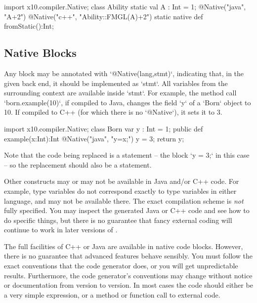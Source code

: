 \begin{xten}
import x10.compiler.Native;
class Ability {
  static val A : Int = 1;
  @Native("java", "A+2")
  @Native("c++", "Ability::FMGL(A)+2")
  static native def fromStatic():Int;
}
\end{xten}
%




\subsection{Native Blocks}

Any block may be annotated with \xcd`@Native(lang,stmt)`, indicating that, in
the given back end, it should be implemented as \xcd`stmt`. All 
variables  from the surrounding context are available inside \xcd`stmt`. For
example, the method call \xcd`born.example(10)`, if compiled to Java, changes
the field \xcd`y` of a \xcd`Born` object to 10. If compiled to C++ (for which
there is no \xcd`@Native`), it sets it to 3. 
\begin{xten}
import x10.compiler.Native;
class Born {
  var y : Int = 1; 
  public def example(x:Int):Int{
    @Native("java", "y=x;") 
    {y = 3;}
    return y;
  }
}
\end{xten}
%

Note that the code being replaced is a statement -- the block \xcd`{y = 3;}`
in this case -- so the replacement should also be a statement. 


Other \Xten{} constructs may or may not be available in Java and/or C++ code.  For
example, type variables do not correspond exactly to type variables in either
language, and may not be available there.  The exact compilation scheme is
{\em not} fully specified.  You may inspect the generated Java or C++ code and
see how to do specific things, but there is no guarantee that fancy external
coding will continue to work in later versions of \Xten{}.



The full facilities of C++ or Java are available in native code blocks.
However, there is no guarantee that advanced features behave sensibly. You
must follow the exact conventions that the code generator does, or you will
get unpredictable results.  Furthermore, the code generator's conventions may
change without notice or documentation from version to version.  In most cases
the  code should either be a very simple expression, or a method
or function call to external code.


